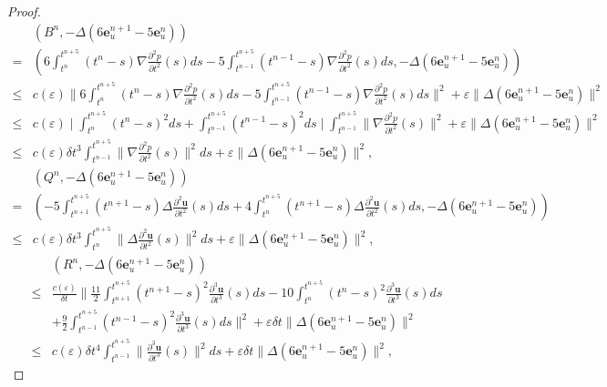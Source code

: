 \documentclass[10pt]{article}
\begin{document}
\begin{proof}
{\begin{align}
		&(B^n,-\Delta(6\bm{e}_u^{n+1}-5\bm{e}_u^n))\\
		= &(6\int^{t^{n+5}}_{t^n}(t^n-s)\nabla\frac{\partial^2p}{\partial t^2}(s)ds-5\int^{t^{n+5}}_{t^{n-1}}(t^{n-1}-s)\nabla\frac{\partial^2p}{\partial t^2}(s)ds,-\Delta(6\bm{e}_u^{n+1}-5\bm{e}_u^n))\nonumber\\
		\leq&c(\varepsilon)\|6\int^{t^{n+5}}_{t^n}(t^n-s)\nabla\frac{\partial^2p}{\partial t^2}(s)ds-5\int^{t^{n+5}}_{t^{n-1}}(t^{n-1}-s)\nabla\frac{\partial^2p}{\partial t^2}(s)ds\|^2+\varepsilon \|\Delta(6\bm{e}_u^{n+1}-5\bm{e}_u^n)\|^2\nonumber\\
		\leq&c(\varepsilon)\mid\int^{t^{n+5}}_{t^{n}}(t^n-s)^2ds+\int^{t^{n+5}}_{t^{n-1}}(t^{n-1}-s)^2ds\mid\int^{t^{n+5}}_{t^{n-1}}\|\nabla\frac{\partial^2p}{\partial t^2}(s)\|^2+\varepsilon \|\Delta(6\bm{e}_u^{n+1}-5\bm{e}_u^n)\|^2\nonumber\\
		\leq & c(\varepsilon)\delta t^3\int^{t^{n+5}}_{t^{n-1}}\|\nabla\frac{\partial^2p}{\partial t^2}(s)\|^2ds+\varepsilon \|\Delta(6\bm{e}_u^{n+1}-5\bm{e}_u^n)\|^2,\nonumber
	\end{align}}
		\begin{align}
			&(Q^n,-\Delta(6\bm{e}_u^{n+1}-5\bm{e}_u^n))\\
			= &(
			-5\int^{t^{n+5}}_{t^{n+1}}(t^{n+1}-s)\Delta\frac{\partial^2\bm{u}}{\partial t^2}(s)ds+4\int^{t^{n+5}}_{t^{n}}(t^{n+1}-s)\Delta\frac{\partial^2\bm{u}}{\partial t^2}(s)ds,-\Delta(6\bm{e}_u^{n+1}-5\bm{e}_u^n))\nonumber\\
			\leq & c(\varepsilon)\delta t^3\int^{t^{n+5}}_{t^{n}}\|\Delta\frac{\partial^2\bm{u}}{\partial t^2}(s)\|^2ds+\varepsilon\|\Delta(6\bm{e}_u^{n+1}-5\bm{e}_u^n)\|^2,
		\end{align}
		\begin{align}
			&(R^n,-\Delta(6\bm{e}_u^{n+1}-5\bm{e}_u^n))\nonumber\\
			\leq &\frac{c(\varepsilon)}{\delta t}\|\frac{11}{2}\int^{t^{n+5}}_{t^{n+1}}(t^{n+1}-s)^2\frac{\partial^3\bm{u}}{\partial t^3}(s)ds-10\int^{t^{n+5}}_{t^{n}}(t^{n}-s)^2\frac{\partial^3\bm{u}}{\partial t^3}(s)ds\nonumber\\
			&+\frac{9}{2}\int^{t^{n+5}}_{t^{n-1}}(t^{n-1}-s)^2\frac{\partial^3\bm{u}}{\partial t^3}(s)ds\|^2  +\varepsilon\delta t\|\Delta(6\bm{e}_u^{n+1}-5\bm{e}_u^n)\|^2\nonumber\\
			\leq & c(\varepsilon)\delta t^4\int^{t^{n+5}}_{t^{n-1}}\|\frac{\partial^3\bm{u}}{\partial t^3}(s)\|^2ds+\varepsilon\delta t\|\Delta(6\bm{e}_u^{n+1}-5\bm{e}_u^n)\|^2,
		\end{align}

\end{proof}
\end{document}
